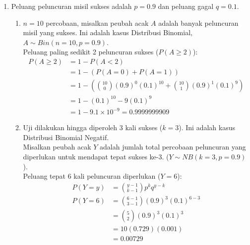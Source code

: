 \documentclass[11pt,letterpaper]{article}
\begin{document}
\begin{enumerate}
  \item Peluang peluncuran misil sukses adalah $p = 0.9$ dan peluang gagal $q = 0.1$.
        \begin{enumerate}[label=\alph*.]
          \item $n = 10$ percobaan, misalkan peubah acak $A$ adalah banyak peluncuran misil yang sukses. Ini adalah kasus Distribusi Binomial, $A \sim Bin(n=10, p=0.9)$. \\
                Peluang paling sedikit 2 peluncuran sukses ($P(A \ge 2)$):
                \begin{align*}
                  P(A \ge 2) & = 1 - P(A < 2)                                                                        \\
                             & = 1 - \left( P(A=0) + P(A=1) \right)                                                  \\
                             & = 1 - \left( \binom{10}{0} (0.9)^0 (0.1)^{10} + \binom{10}{1} (0.9)^1 (0.1)^9 \right) \\
                             & = 1 - (0.1)^{10} - 9(0.1)^9                                                           \\
                             & = 1 - 9.1 \times 10^{-9} = 0.9999999909
                \end{align*}
          \item Uji dilakukan hingga diperoleh 3 kali sukses ($k=3$). Ini adalah kasus Distribusi Binomial Negatif. \\
                Misalkan peubah acak $Y$ adalah jumlah total percobaan peluncuran yang diperlukan untuk mendapat tepat sukses ke-3. ($Y \sim NB(k=3, p=0.9)$). \\
                Peluang tepat 6 kali peluncuran diperlukan ($Y=6$):
                \begin{align*}
                  P(Y = y) & = \binom{y-1}{k-1} p^k q^{y-k}         \\
                  P(Y = 6) & = \binom{6-1}{3-1} (0.9)^3 (0.1)^{6-3} \\
                           & = \binom{5}{2} (0.9)^3 (0.1)^3         \\
                           & = 10 (0.729) (0.001)                   \\
                           & = 0.00729
                \end{align*}
        \end{enumerate}
\end{enumerate}
\end{document}
